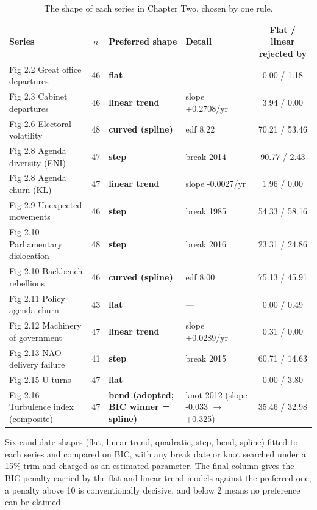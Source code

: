 \begin{table}[htbp]\centering
\caption{The shape of each series in Chapter Two, chosen by one rule.}
\label{tab:ch2shapes}
\begin{threeparttable}
\begin{tabular}{p{5.2cm} c l l c}
\toprule
Series & $n$ & Preferred shape & Detail & Flat / linear rejected by \\
\midrule
Fig 2.2  Great office departures & 46 & \textbf{flat} & --- &  0.00 /  1.18 \\
Fig 2.3  Cabinet departures & 46 & \textbf{linear trend} & slope +0.2708/yr &  3.94 /  0.00 \\
Fig 2.6  Electoral volatility & 48 & \textbf{curved (spline)} & edf 8.22 & 70.21 / 53.46 \\
Fig 2.8  Agenda diversity (ENI) & 47 & \textbf{step} & break 2014 & 90.77 /  2.43 \\
Fig 2.8  Agenda churn (KL) & 47 & \textbf{linear trend} & slope -0.0027/yr &  1.96 /  0.00 \\
Fig 2.9  Unexpected movements & 46 & \textbf{step} & break 1985 & 54.33 / 58.16 \\
Fig 2.10 Parliamentary dislocation & 48 & \textbf{step} & break 2016 & 23.31 / 24.86 \\
Fig 2.10 Backbench rebellions & 46 & \textbf{curved (spline)} & edf 8.00 & 75.13 / 45.91 \\
Fig 2.11 Policy agenda churn & 43 & \textbf{flat} & --- &  0.00 /  0.49 \\
Fig 2.12 Machinery of government & 47 & \textbf{linear trend} & slope +0.0289/yr &  0.31 /  0.00 \\
Fig 2.13 NAO delivery failure & 41 & \textbf{step} & break 2015 & 60.71 / 14.63 \\
Fig 2.15 U-turns & 47 & \textbf{flat} & --- &  0.00 /  3.80 \\
Fig 2.16 Turbulence index (composite) & 47 & \textbf{bend (adopted; BIC winner = spline)} & knot 2012 (slope -0.033 $\to$ +0.325) & 35.46 / 32.98 \\
\bottomrule
\end{tabular}
\begin{tablenotes}\footnotesize
\item Six candidate shapes (flat, linear trend, quadratic, step, bend, spline) fitted to each series and compared on BIC, with any break date or knot searched under a 15\% trim and charged as an estimated parameter. The final column gives the BIC penalty carried by the flat and linear-trend models against the preferred one; a penalty above 10 is conventionally decisive, and below 2 means no preference can be claimed.

\end{tablenotes}
\end{threeparttable}
\end{table}
